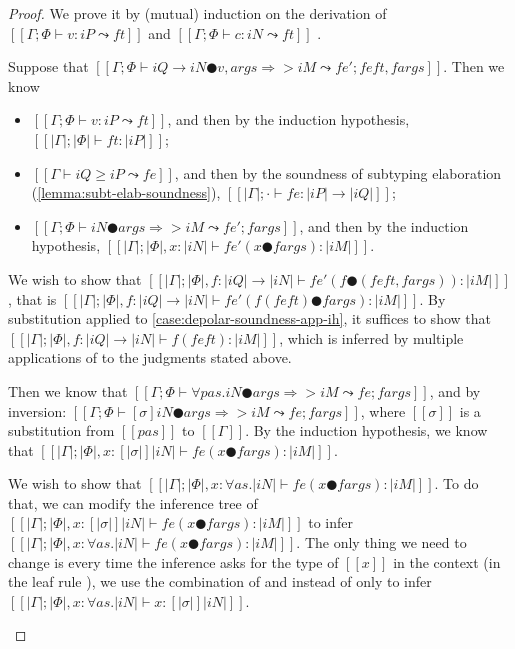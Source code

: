 \lemmaDepolarSoundness*
\begin{proof}
  We prove it by (mutual) induction on the derivation of $[[Γ; Φ ⊢ v : iP ⤳ ft]]$ 
  and $[[Γ; Φ ⊢ c : iN ⤳ ft]]$ .

  \begin{caseof}
    \item {}
      Suppose that $[[Γ ; Φ ⊢ iQ → iN ● v , args ⇒> iM ⤳ fe'; fe ft, fargs]]$.
      Then we know 
      \begin{itemize}
        \item $[[Γ ; Φ ⊢ v : iP ⤳ ft]]$, and then by the induction hypothesis,
          $[[|Γ| ; |Φ| ⊢ ft : |iP|]]$;
        \item $[[Γ ⊢ iQ ≥ iP ⤳ fe]]$, and then by the soundness of 
          subtyping elaboration (\cref{lemma:subt-elab-soundness}),
          $[[|Γ| ; · ⊢ fe : |iP| → |iQ|]]$;
        \item \label{case:depolar-soundness-app-ih}
          $[[Γ ; Φ ⊢ iN ● args ⇒> iM ⤳ fe'; fargs]]$, and then by the induction hypothesis, 
          $[[|Γ| ; |Φ|, x:|iN| ⊢ fe' (x ● fargs) : |iM|]]$.
      \end{itemize}
      We wish to show that $[[|Γ| ; |Φ|, f : |iQ| → |iN| ⊢ fe' (f ● (fe ft, fargs)) : |iM|]]$,
      that is $[[|Γ| ; |Φ|, f : |iQ| → |iN| ⊢ fe' (f (fe ft) ● fargs) : |iM|]]$.
      By substitution applied to \cref{case:depolar-soundness-app-ih}, it suffices to show that 
      $[[|Γ| ; |Φ|, f : |iQ| → |iN| ⊢ f (fe ft) : |iM|]]$,
      which is inferred by multiple applications of   to the
      judgments stated above.
    \item {}
      Then we know that 
      $[[Γ ; Φ ⊢ ∀pas.iN ● args ⇒> iM  ⤳ fe ; fargs]]$, and by inversion:
      $[[Γ ; Φ ⊢ [σ]iN ● args ⇒> iM  ⤳ fe ; fargs]]$,
      where $[[σ]]$ is a substitution from $[[pas]]$ to $[[Γ]]$.
      By the induction hypothesis, we know that
      $[[|Γ| ; |Φ|, x : [|σ|]|iN| ⊢ fe (x ● fargs) : |iM|]]$.

      We wish to show that 
      $[[|Γ| ; |Φ|, x : ∀as.|iN| ⊢ fe (x ● fargs) : |iM| ]]$.
      To do that, we can modify the inference tree of 
      $[[|Γ| ; |Φ|, x : [|σ|]|iN| ⊢ fe (x ● fargs) : |iM|]]$
      to infer 
      $[[|Γ| ; |Φ|, x  : ∀as.|iN| ⊢ fe (x ● fargs) : |iM|]]$.
      The only thing we need to change is every time 
      the inference asks for the type of $[[x]]$ in the context
      (\ie in the leaf rule ), 
      we use the combination of  and 
      instead of only  to infer $[[|Γ| ; |Φ|, x : ∀as.|iN| ⊢ x : [|σ|]|iN| ]]$.


\end{caseof}
\end{proof}
